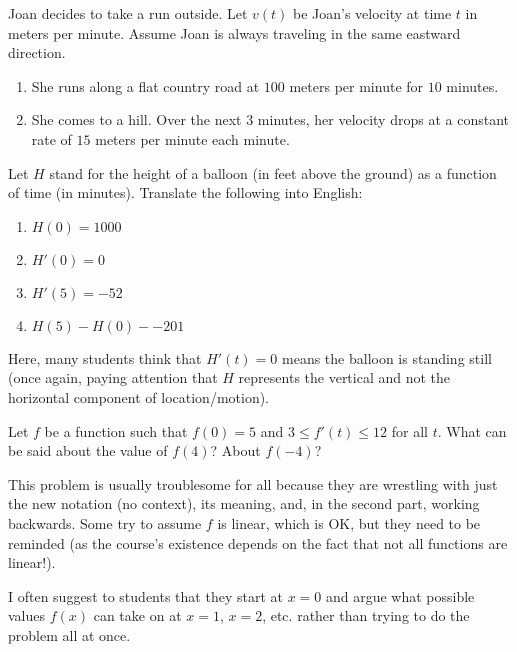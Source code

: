 \documentclass{ximera}
\begin{document}
\begin{question}	Joan decides to take a run outside.  Let $v(t)$ be Joan's velocity at time $t$ in meters per minute. Assume Joan is always traveling in the same eastward direction.
\begin{enumerate}
\item She runs along a flat country road at $100$ meters per minute for $10$ minutes.
\item She comes to a hill.  Over the next $3$ minutes, her velocity drops at a constant rate of $15$ meters per minute each minute.
\end{enumerate}
\end{question} 

\begin{question} Let $H$ stand for the height of a balloon (in feet above the ground) as a function of time (in minutes).  Translate the following into English:
\begin{enumerate}
    \item $H(0) = 1000$
    \item $H'(0) = 0$
    \item $H'(5) = -52$
    \item $H(5) - H(0) - -201$
\end{enumerate}

\begin{instructorNotes}
Here, many students think that $H'(t) = 0$ means the balloon is standing still (once again, paying attention that $H$ represents the vertical and not the horizontal component of location/motion).  
\end{instructorNotes}


\end{question} 


\begin{question} 
Let $f$ be a function such that $f(0) = 5$ and $3 \leq f'(t) \leq 12$ for all $t$.  What can be said about the value of $f(4)$?  About $f(-4)$?

\begin{instructorNotes}
This problem is usually troublesome for all because they are wrestling with just the new notation (no context), its meaning, and, in the second part, working backwards.  Some try to assume $f$ is linear, which is OK, but they need to be reminded (as the course's existence depends on the fact that not all functions are linear!).

I often suggest to students that they start at $x = 0$ and argue what possible values $f(x)$ can take on at $x = 1$, $x = 2$, etc. rather than trying to do the problem all at once.
\end{instructorNotes}

\end{question}
\end{document}
